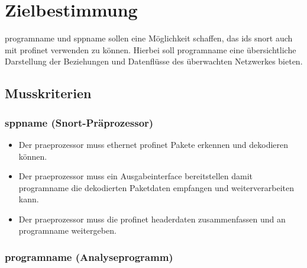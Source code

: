 \chapter{Zielbestimmung}

\gls{programname} und \gls{sppname} sollen eine Möglichkeit schaffen, das \gls{ids} \gls{snort} auch mit \gls{profinet} verwenden zu können.
Hierbei soll \gls{programname} eine übersichtliche Darstellung der Beziehungen und Datenflüsse des überwachten Netzwerkes bieten.

\section{Musskriterien}

\subsection{\gls{sppname} (Snort-Präprozessor)}

\begin{itemize}
\item Der \gls{praeprozessor} muss \gls{ethernet} \gls{profinet} Pakete erkennen und dekodieren können.

\item Der \gls{praeprozessor} muss ein Ausgabeinterface bereitstellen damit \gls{programname} die dekodierten Paketdaten empfangen und weiterverarbeiten kann.

\item Der \gls{praeprozessor} muss die \gls{profinet} \gls{headerdaten} zusammenfassen und an \gls{programname} weitergeben.
\end{itemize}

\subsection{\gls{programname} (Analyseprogramm)}

